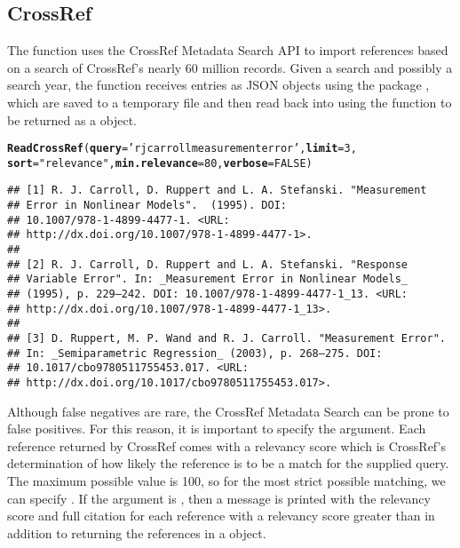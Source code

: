 \documentclass[article]{jss}\usepackage[]{graphicx}\usepackage[]{color}
\makeatletter
\newcommand{\hlnum}[1]{\textcolor[rgb]{0.125,0.125,1}{#1}}%
\newcommand{\hlstr}[1]{\textcolor[rgb]{0.125,0.125,1}{#1}}%
\newcommand{\hlstd}[1]{\textcolor[rgb]{0.251,0.251,0.282}{#1}}%
\newcommand{\hlkwc}[1]{\textcolor[rgb]{0.529,0,0.184}{\textbf{#1}}}%
\newcommand{\hlkwd}[1]{\textcolor[rgb]{0.251,0.251,0.282}{\textbf{#1}}}%
\newenvironment{kframe}{%
 \def\at@end@of@kframe{}%
 \ifinner\ifhmode%
  \def\at@end@of@kframe{\end{minipage}}%
  \begin{minipage}{\columnwidth}%
 \fi\fi%
 \def\FrameCommand##1{\hskip\@totalleftmargin \hskip-\fboxsep
 \colorbox{shadecolor}{##1}\hskip-\fboxsep
     \hskip-\linewidth \hskip-\@totalleftmargin \hskip\columnwidth}%
 \MakeFramed {\advance\hsize-\width
   \@totalleftmargin\z@ \linewidth\hsize
   \@setminipage}}%
 {\par\unskip\endMakeFramed%
 \at@end@of@kframe}
\newenvironment{knitrout}{}{} %
\makeatother
\begin{document}
\subsection{CrossRef}
The function  uses the CrossRef Metadata Search API to import references based on a search of CrossRef's nearly 60 million records.  Given a search and possibly a search year, the function receives \Bibtex{} entries as JSON objects using the  package \citep{RJSONIO}, which are saved to a temporary file and then read back into \R{} using the  function to be returned as a  object.
\begin{knitrout}
\color{fgcolor}\begin{kframe}
\begin{alltt}
\hlkwd{ReadCrossRef}\hlstd{(}\hlkwc{query} \hlstd{=} \hlstr{'rj carroll measurement error'}\hlstd{,} \hlkwc{limit} \hlstd{=} \hlnum{3}\hlstd{,}
             \hlkwc{sort} \hlstd{=} \hlstr{"relevance"}\hlstd{,} \hlkwc{min.relevance} \hlstd{=} \hlnum{80}\hlstd{,} \hlkwc{verbose} \hlstd{=} \hlnum{FALSE}\hlstd{)}
\end{alltt}
\begin{verbatim}
## [1] R. J. Carroll, D. Ruppert and L. A. Stefanski. "Measurement
## Error in Nonlinear Models".  (1995). DOI:
## 10.1007/978-1-4899-4477-1. <URL:
## http://dx.doi.org/10.1007/978-1-4899-4477-1>.
## 
## [2] R. J. Carroll, D. Ruppert and L. A. Stefanski. "Response
## Variable Error". In: _Measurement Error in Nonlinear Models_
## (1995), p. 229–242. DOI: 10.1007/978-1-4899-4477-1_13. <URL:
## http://dx.doi.org/10.1007/978-1-4899-4477-1_13>.
## 
## [3] D. Ruppert, M. P. Wand and R. J. Carroll. "Measurement Error".
## In: _Semiparametric Regression_ (2003), p. 268–275. DOI:
## 10.1017/cbo9780511755453.017. <URL:
## http://dx.doi.org/10.1017/cbo9780511755453.017>.
\end{verbatim}
\end{kframe}
\end{knitrout}


Although false negatives are rare, the CrossRef Metadata Search can be prone to false positives.  For this reason, it is important to specify the  argument.  Each reference returned by CrossRef comes with a relevancy score which is CrossRef's determination of how likely the reference is to be a match for the supplied query.  The maximum possible value is 100, so for the most strict possible matching, we can specify .  If the argument  is , then a message is printed with the relevancy score and full citation for each reference with a relevancy score greater than  in addition to returning the references in a  object.
\end{document}
